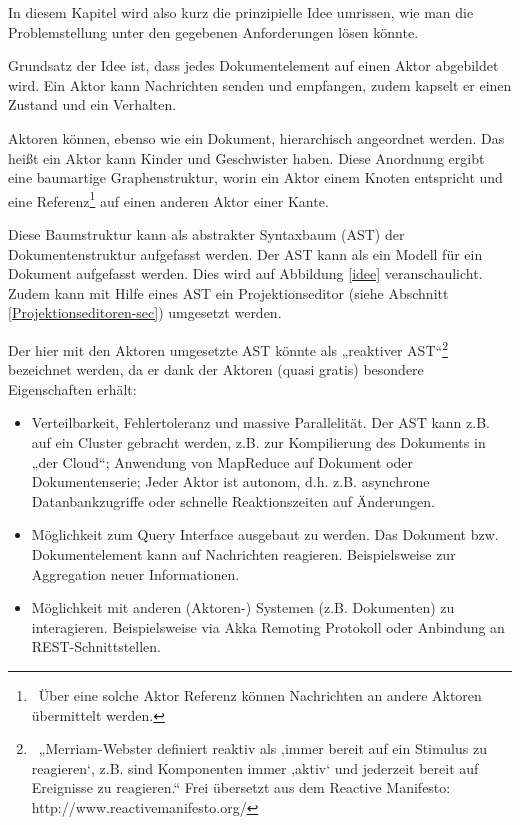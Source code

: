  
In diesem Kapitel wird also kurz die prinzipielle Idee umrissen, wie man die Problemstellung unter den gegebenen Anforderungen lösen könnte.

 
Grundsatz der Idee ist, dass jedes Dokumentelement auf einen Aktor abgebildet wird. Ein Aktor kann Nachrichten senden und empfangen, zudem kapselt er einen Zustand und ein Verhalten.

 
Aktoren können, ebenso wie ein Dokument, hierarchisch angeordnet werden. Das heißt ein Aktor kann Kinder und Geschwister haben. Diese Anordnung ergibt eine baumartige Graphenstruktur, worin ein Aktor einem Knoten entspricht und eine Referenz\footnote{~Über eine solche Aktor Referenz können Nachrichten an andere Aktoren übermittelt werden.} auf einen anderen Aktor einer Kante.

 
Diese Baumstruktur kann als abstrakter Syntaxbaum (AST) der Dokumentenstruktur aufgefasst werden. Der AST kann als ein Modell für ein Dokument aufgefasst werden. Dies wird auf Abbildung \ref{idee} veranschaulicht. Zudem kann mit Hilfe eines AST ein Projektionseditor (siehe Abschnitt \ref{Projektionseditoren-sec}) umgesetzt werden.

 
Der hier mit den Aktoren umgesetzte AST könnte als „reaktiver AST“\footnote{~„Merriam-Webster definiert reaktiv als ‚immer bereit auf ein Stimulus zu reagieren‘, z.B. sind Komponenten immer ‚aktiv‘ und jederzeit bereit auf Ereignisse zu reagieren.“ Frei übersetzt aus dem Reactive Manifesto: http://www.reactivemanifesto.org/} bezeichnet werden, da er dank der Aktoren (quasi gratis) besondere Eigenschaften erhält:

 
\begin{itemize}

\item Verteilbarkeit, Fehlertoleranz und massive Parallelität. Der AST kann z.B. auf ein Cluster gebracht werden, z.B. zur Kompilierung des Dokuments in „der Cloud“; Anwendung von MapReduce auf Dokument oder Dokumentenserie; Jeder Aktor ist autonom, d.h. z.B. asynchrone Datanbankzugriffe oder schnelle Reaktionszeiten auf Änderungen.
\item Möglichkeit zum Query Interface ausgebaut zu werden. Das Dokument bzw. Dokumentelement kann auf Nachrichten reagieren. Beispielsweise zur Aggregation neuer Informationen.
\item Möglichkeit mit anderen (Aktoren-) Systemen (z.B. Dokumenten) zu interagieren. Beispielsweise via Akka Remoting Protokoll oder Anbindung an REST-Schnittstellen.
\end{itemize}
 
